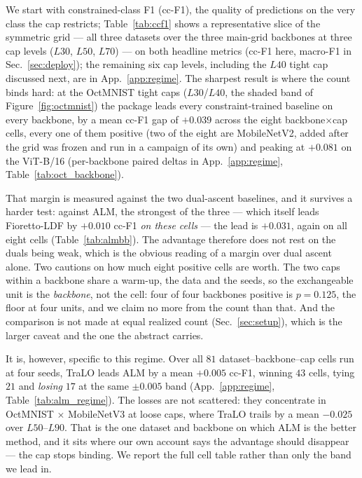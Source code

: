 \documentclass[10pt]{article}
\begin{document}
We start with constrained-class F1 (cc-F1), the quality of predictions on
the very class the cap restricts; Table~\ref{tab:ccf1} shows %
{a representative slice of the symmetric grid --- all three datasets
over the three main-grid backbones at three cap levels ($L30$, $L50$, $L70$) ---}
on both
headline metrics (cc-F1 here, macro-F1 in Sec.~\ref{sec:deploy}){;
the remaining six cap levels, including the $L40$ tight cap discussed next, are
in App.~\ref{app:regime}}. The
sharpest result is where the count binds hard: at the OctMNIST tight caps
($L30$/$L40$, the shaded band of Figure~\ref{fig:octmnist}) the package
leads %
{every constraint-trained baseline} on every backbone, by a mean
cc-F1 gap of %
{$+0.039$ across the eight backbone$\times$cap cells, every one of
them positive (two of the eight are MobileNetV2, added after the grid was frozen
and run in a campaign of its own)} and
peaking at $+0.081$ on the ViT-B/16 (per-backbone paired deltas in
{App.~\ref{app:regime}, }Table~\ref{tab:oct_backbone}).
{That margin is measured against the two dual-ascent baselines, and
it survives a harder test: against ALM, the strongest of the three --- which
itself leads Fioretto-LDF by $+0.010$ cc-F1 \emph{on these cells} --- the lead is
$+0.031$, again on
all eight cells (Table~\ref{tab:almbb}). The advantage therefore does not rest
on the duals being weak, which is the obvious reading of a margin over dual ascent
alone. Two cautions on how much eight positive cells are worth. The two caps
within a backbone share a warm-up, the data and the seeds, so the exchangeable
unit is the \emph{backbone}, not the cell: four of four backbones positive is
$p{=}0.125$, the floor at four units, and we claim no more from the count than
that. And the comparison is not made at equal realized count
(Sec.~\ref{sec:setup}), which is the larger caveat and the one the abstract
carries.

It is, however, specific to this regime. Over all $81$ dataset--backbone--cap cells run at four seeds, TraLO leads
ALM by a mean $+0.005$ cc-F1, winning $43$ cells, tying $21$ and \emph{losing}
$17$ at the same $\pm0.005$ band ({App.~\ref{app:regime}, }Table~\ref{tab:alm_regime}). The losses are not
scattered: they concentrate in OctMNIST $\times$ MobileNetV3 at loose caps, where
TraLO trails by a mean $-0.025$ over $L50$--$L90$. That is the one dataset and
backbone on which ALM is the better method, and it sits where our own
account says the advantage should disappear {--- the cap
stops binding. We report the full cell table rather than only the band we lead in.}}
\end{document}
